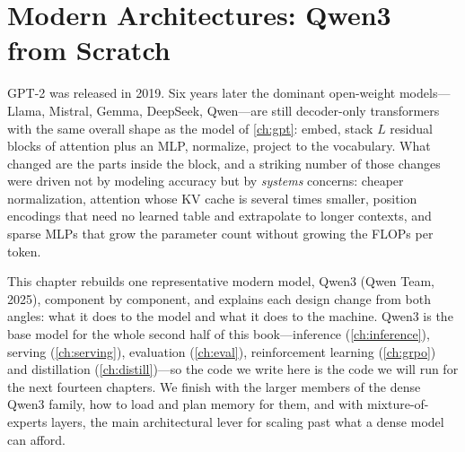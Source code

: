 \chapter{Modern Architectures: Qwen3 from Scratch}\label{ch:modern}

GPT-2 was released in 2019. Six years later the dominant open-weight models---Llama, Mistral,
Gemma, DeepSeek, Qwen---are still decoder-only transformers with the same overall shape as the
model of \cref{ch:gpt}: embed, stack $L$ residual blocks of attention plus an MLP, normalize, project to
the vocabulary. What changed are the parts inside the block, and a striking number of those changes
were driven not by modeling accuracy but by \emph{systems} concerns: cheaper normalization, attention
whose KV cache is several times smaller, position encodings that need no learned table and extrapolate
to longer contexts, and sparse MLPs that grow the parameter count without growing the FLOPs per token.

This chapter rebuilds one representative modern model, Qwen3 (Qwen Team, 2025), component by
component, and explains each design change from both angles: what it does to the model and what it
does to the machine. Qwen3 is the base model for the whole second half of this book---inference
(\cref{ch:inference}), serving (\cref{ch:serving}), evaluation (\cref{ch:eval}), reinforcement learning
(\cref{ch:grpo}) and distillation (\cref{ch:distill})---so the code we write here is the code we will
run for the next fourteen chapters. We finish with the larger members of the dense Qwen3 family, how to
load and plan memory for them, and with mixture-of-experts layers, the main architectural lever for
scaling past what a dense model can afford.

